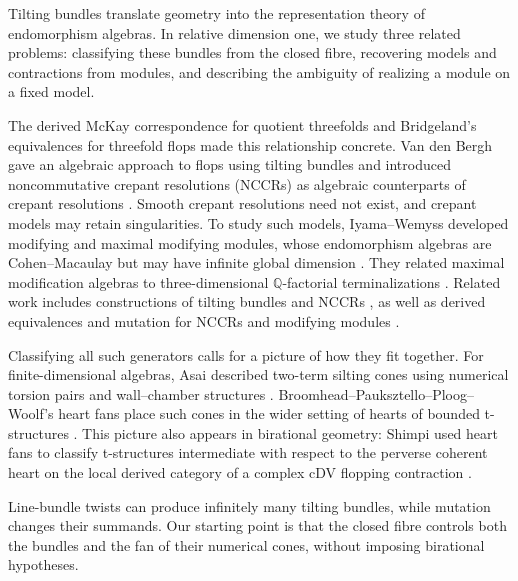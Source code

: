 \documentclass[a4paper,reqno]{amsart}
\theoremstyle{definition}
\begin{document}
Tilting bundles translate geometry into the representation theory of endomorphism algebras. In relative dimension one, we study three related problems: classifying these bundles from the closed fibre, recovering models and contractions from modules, and describing the ambiguity of realizing a module on a fixed model.

The derived McKay correspondence for quotient threefolds \cite{BKR} and Bridgeland's equivalences for threefold flops \cite{Bri02} made this relationship concrete. Van den Bergh gave an algebraic approach to flops using tilting bundles \cite{VdB04b} and introduced noncommutative crepant resolutions (NCCRs) as algebraic counterparts of crepant resolutions \cite{VdB04a}. Smooth crepant resolutions need not exist, and crepant models may retain singularities. To study such models, Iyama--Wemyss developed modifying and maximal modifying modules, whose endomorphism algebras are Cohen--Macaulay but may have infinite global dimension \cite{IW}. They related maximal modification algebras to three-dimensional $\mathbb Q$-factorial terminalizations \cite{IW14}. Related work includes constructions of tilting bundles \cite{Bei,Kap,BH,TU10,HP14,Har,Tom25a} and NCCRs \cite{Aus86,Bro,HN,SVdB17,SVdB20a,SVdB20b,Tom24}, as well as derived equivalences and mutation for NCCRs and modifying modules \cite{IR,IW13,IW,IW14,IW18,Wem18,HH24}.

Classifying all such generators calls for a picture of how they fit together. For finite-dimensional algebras, Asai described two-term silting cones using numerical torsion pairs and wall--chamber structures \cite{Asa21}. Broomhead--Pauksztello--Ploog--Woolf's heart fans place such cones in the wider setting of hearts of bounded t-structures \cite{BPPW24}. This picture also appears in birational geometry: Shimpi used heart fans to classify t-structures intermediate with respect to the perverse coherent heart on the local derived category of a complex cDV flopping contraction \cite{Shi26}.

Line-bundle twists can produce infinitely many tilting bundles, while mutation changes their summands. Our starting point is that the closed fibre controls both the bundles and the fan of their numerical cones, without imposing birational hypotheses.
\end{document}
